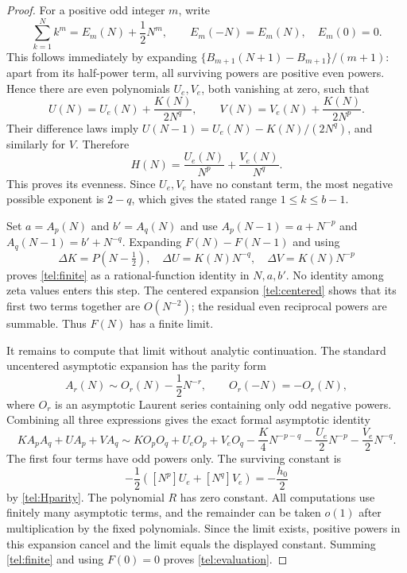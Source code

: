 \documentclass[11pt,letterpaper]{article}
\numberwithin{equation}{section}
\theoremstyle{plain}
\theoremstyle{definition}
\theoremstyle{remark}
\begin{document}
\begin{proof}
For a positive odd integer $m$, write
\[
 \sum_{k=1}^N k^m=E_m(N)+\frac12N^m,
 \qquad E_m(-N)=E_m(N),\quad E_m(0)=0.
\]
This follows immediately by expanding
$\{B_{m+1}(N+1)-B_{m+1}\}/(m+1)$: apart from its half-power term,
all surviving powers are positive even powers. Hence there are even
polynomials $U_e,V_e$, both vanishing at zero, such that
\[
 U(N)=U_e(N)+\frac{K(N)}{2N^q},\qquad
 V(N)=V_e(N)+\frac{K(N)}{2N^p}.
\]
Their difference laws imply
$U(N-1)=U_e(N)-K(N)/(2N^q)$, and similarly for $V$.
Therefore
\begin{equation}\label{tel:Hparity}
 H(N)=\frac{U_e(N)}{N^p}+\frac{V_e(N)}{N^q}.
\end{equation}
This proves its evenness. Since $U_e,V_e$ have no constant term, the
most negative possible exponent is $2-q$, which gives the stated range
$1\le k\le b-1$.

Set $a=A_p(N)$ and $b'=A_q(N)$ and use
$A_p(N-1)=a+N^{-p}$ and $A_q(N-1)=b'+N^{-q}$.
Expanding $F(N)-F(N-1)$ and using
\[
 \Delta K=P(N-\tfrac12),\quad
 \Delta U=K(N)N^{-q},\quad \Delta V=K(N)N^{-p}
\]
proves \eqref{tel:finite} as a rational-function identity in
$N,a,b'$. No identity among zeta values enters this step.
The centered expansion \eqref{tel:centered} shows that its first
two terms together are $O(N^{-2})$; the residual even reciprocal
powers are summable. Thus $F(N)$ has a finite limit.

It remains to compute that limit without analytic continuation.
The standard uncentered asymptotic expansion has the parity form
\[
 A_r(N)\sim O_r(N)-\frac12N^{-r},
 \qquad O_r(-N)=-O_r(N),
\]
where $O_r$ is an asymptotic Laurent series containing only odd
negative powers. Combining all three expressions gives the exact
formal asymptotic identity
\[
 KA_pA_q+UA_p+VA_q\sim
 KO_pO_q+U_eO_p+V_eO_q-\frac K4N^{-p-q}
   -\frac{U_e}{2}N^{-p}-\frac{V_e}{2}N^{-q}.
\]
The first four terms have odd powers only. The surviving constant is
\[
 -\frac12\left([N^p]U_e+[N^q]V_e\right)=-\frac{h_0}{2}
\]
by \eqref{tel:Hparity}. The polynomial $R$ has zero constant.
All computations use finitely many asymptotic terms, and the remainder
can be taken $o(1)$ after multiplication by the fixed polynomials.
Since the limit exists, positive powers in this expansion cancel and
the limit equals the displayed constant. Summing \eqref{tel:finite}
and using $F(0)=0$ proves \eqref{tel:evaluation}.
\end{proof}
\end{document}
